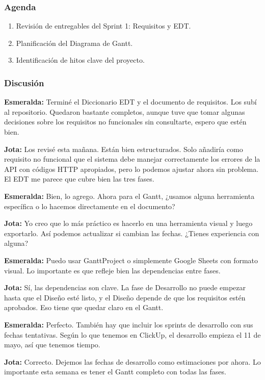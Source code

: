 \documentclass[12pt, a4paper]{article}
\newcommand{\jota}[1]{\noindent\textbf{\color{primary}Jota:} #1\par\smallskip}
\newcommand{\esme}[1]{\noindent\textbf{\color{accentgreen}Esmeralda:} #1\par\smallskip}
\begin{document}
\subsubsection*{Agenda}
\begin{enumerate}[leftmargin=1.5em]
  \item Revisión de entregables del Sprint 1: Requisitos y EDT.
  \item Planificación del Diagrama de Gantt.
  \item Identificación de hitos clave del proyecto.
\end{enumerate}

\subsubsection*{Discusión}

\esme{Terminé el Diccionario EDT y el documento de requisitos. Los subí al repositorio. Quedaron bastante completos, aunque tuve que tomar algunas decisiones sobre los requisitos no funcionales sin consultarte, espero que estén bien.}

\jota{Los revisé esta mañana. Están bien estructurados. Solo añadiría como requisito no funcional que el sistema debe manejar correctamente los errores de la API con códigos HTTP apropiados, pero lo podemos ajustar ahora sin problema. El EDT me parece que cubre bien las tres fases.}

\esme{Bien, lo agrego. Ahora para el Gantt, ¿usamos alguna herramienta específica o lo hacemos directamente en el documento?}

\jota{Yo creo que lo más práctico es hacerlo en una herramienta visual y luego exportarlo. Así podemos actualizar si cambian las fechas. ¿Tienes experiencia con alguna?}

\esme{Puedo usar GanttProject o simplemente Google Sheets con formato visual. Lo importante es que refleje bien las dependencias entre fases.}

\jota{Sí, las dependencias son clave. La fase de Desarrollo no puede empezar hasta que el Diseño esté listo, y el Diseño depende de que los requisitos estén aprobados. Eso tiene que quedar claro en el Gantt.}

\esme{Perfecto. También hay que incluir los sprints de desarrollo con sus fechas tentativas. Según lo que tenemos en ClickUp, el desarrollo empieza el 11 de mayo, así que tenemos tiempo.}

\jota{Correcto. Dejemos las fechas de desarrollo como estimaciones por ahora. Lo importante esta semana es tener el Gantt completo con todas las fases.}
\end{document}
